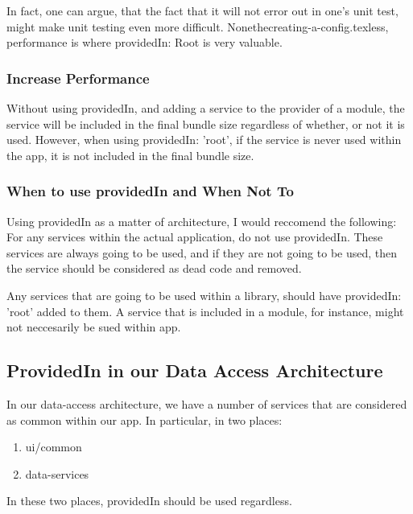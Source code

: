In fact, one can argue, that the fact that it will not error out in one's unit
test, might make unit testing even more difficult. Nonethecreating-a-config.texless, performance is
where providedIn: Root is very valuable.

\subsubsection{ Increase Performance }
Without using providedIn, and adding a service to the provider of a module, the
service will be included in the final bundle size regardless of whether, or not
it is used. However, when using providedIn: 'root', if the service is never
used within the app, it is not included in the final bundle size.

\subsubsection{When to use providedIn and When Not To}
Using providedIn as a matter of architecture, I would reccomend the following:
For any services within the actual application, do not use providedIn. These
services are always going to be used, and if they are not going to be used,
then the service should be considered as dead code and removed.

Any services that are going to be used within a library, should have
providedIn: 'root' added to them. A service that is included in a module, for
instance, might not neccesarily be sued within app.

\subsection{ProvidedIn in our Data Access Architecture}
In our data-access architecture, we have a number of services that are
considered as common within our app. In particular, in two places:
\begin{enumerate}
  \item ui/common
  \item data-services
\end{enumerate}

In these two places, providedIn should be used regardless. 
